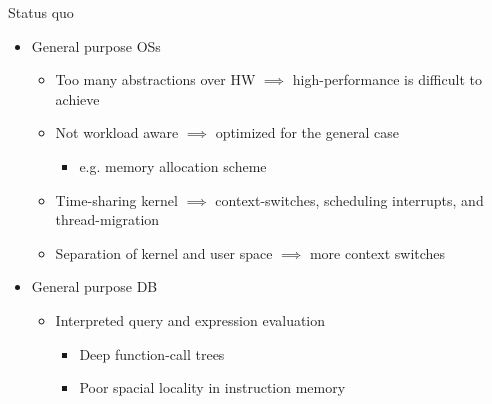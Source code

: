 \vspace{-2cm}
\begin{block}{Status quo}
  \begin{itemize}
  \item {General purpose OSs}
    \begin{itemize}
     \item Too many abstractions over HW $\implies$ high-performance is difficult
      to achieve~\cite{GICEVA:2016:OS_SUPPORT,HALE:2015:NAUTILUS}
    \item Not workload aware $\implies$ optimized for the general case
      \begin{itemize}
      \item e.g. memory allocation scheme
      \end{itemize}
    \item Time-sharing kernel $\implies$ context-switches, scheduling interrupts, and thread-migration
    \item Separation of kernel and user space $\implies$ more context switches
    \end{itemize}
  \item {General purpose DB}
    \begin{itemize}
    \item Interpreted query and expression evaluation
      \begin{itemize}
      \item Deep function-call trees
      \item Poor spacial locality in instruction memory
      \end{itemize}
    \end{itemize}
  \end{itemize}
\end{block}
